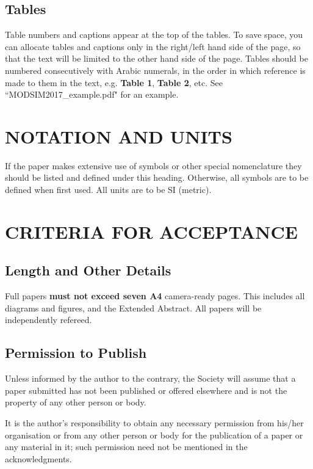 \documentclass[a4paper,fleqn]{article} %
\begin{document}
\subsection{Tables}
Table numbers and captions appear at the top of the tables. To save space, you can allocate tables and captions only in the right/left hand side of the page, so that the text will be limited to the other hand side of the page. Tables should be numbered consecutively with Arabic numerals, in the order in which reference is made to them in the text, e.g. {\bfseries Table 1}, {\bfseries Table 2}, etc. See ``MODSIM2017\_example.pdf" for an example.\par


\section{NOTATION AND UNITS}

If the paper makes extensive use of symbols or other special nomenclature they should be listed and defined under this heading.  Otherwise, all symbols are to be defined when first used.  All units are to be SI (metric).

\section{CRITERIA FOR ACCEPTANCE}

\subsection{Length and Other Details}
Full papers {\bfseries must not exceed seven A4} camera-ready pages. This includes all diagrams and figures, and the Extended Abstract. All papers will be independently refereed.

\subsection{Permission to Publish}
Unless informed by the author to the contrary, the Society will assume that a paper submitted has not been published or offered elsewhere and is not the property of any other person or body. \par

It is the author's responsibility to obtain any necessary permission from his/her organisation or from any other person or body for the publication of a paper or any material in it; such permission need not be mentioned in the acknowledgments. \par
\end{document}

